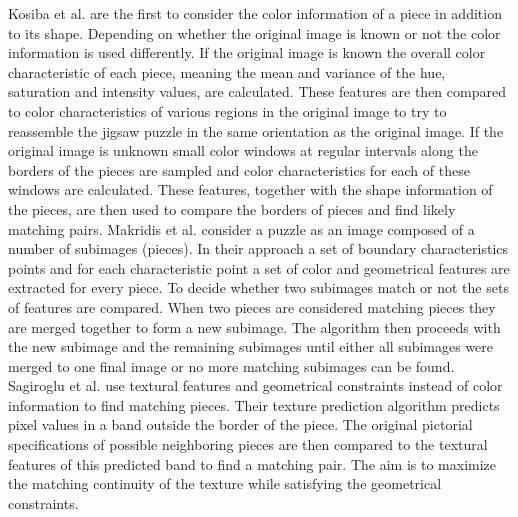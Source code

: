 \documentclass[11pt]{report}
\begin{document}
Kosiba et al. \cite{kosiba1994automatic} are the first to consider the color
information of a piece in addition to its shape. Depending on whether the
original image is known or not the color information is used differently. 
If the original image is known the overall color characteristic of each piece,
meaning the mean and variance of the hue, saturation and intensity values, are
calculated. These features are then compared to color characteristics of
various regions in the original image to try to reassemble the jigsaw puzzle in
the same orientation as the original image. If the original image is unknown
small color windows at regular intervals along the borders of the pieces are sampled
and color characteristics for each of these windows are calculated. These
features, together with the shape information of the pieces, are then used to
compare the borders of pieces and find likely matching pairs. Makridis et al.
\cite{makridis2006new} consider a puzzle as an image composed of a number of
subimages (pieces). In their approach a set of boundary characteristics points and for each
characteristic point a set of color and geometrical features are extracted for
every piece. To decide whether two subimages match or not the sets of features
are compared. When two pieces are considered matching pieces they are
merged together to form a new subimage. The algorithm then proceeds with the new
subimage and the remaining subimages until either all subimages were merged to
one final image or no more matching subimages can be found. Sagiroglu et al.
\cite{sagiroglu2006texture} use textural features and geometrical constraints
instead of color information to find matching pieces. Their texture prediction
algorithm predicts pixel values in a band outside the border of the piece. The
original pictorial specifications of possible neighboring pieces are then
compared to the textural features of this predicted band to find a matching
pair. The aim is to maximize the matching continuity of the texture while
satisfying the geometrical constraints.
\end{document}
